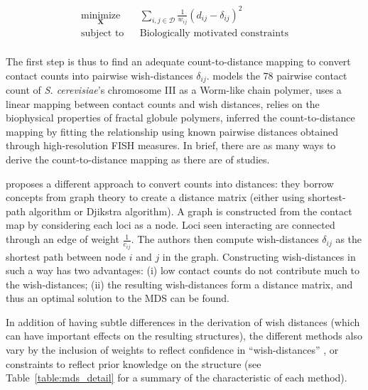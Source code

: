\documentclass[2columns]{article}
\newcommand{\Xb}{\textbf{X}}
\begin{document}
\begin{equation*}
\renewcommand{\arraystretch}{2}
\begin{array}{ccl}
\underset{\Xb}{\text{minimize}} & & \underset{i, j \in \mathcal{D}}{\sum}
\frac{1}{w_{ij}} (d_{ij} - \delta_{ij})^2 \\
\text{subject to} & & \text{Biologically motivated constraints} \\
\end{array}
\end{equation*}


The first step is thus to find an adequate count-to-distance mapping to
convert contact counts into pairwise wish-distances $\delta_{ij}$. 
\citet{dekker:capturing} models the 78 pairwise contact count of {\em S.
cerevisiae}'s chromosome III as a Worm-like chain polymer,
\citet{duan:three-dimensional} uses a linear mapping between contact counts
and wish distances, \citet{ay:three-dimensional} relies on the biophysical
properties of fractal globule polymers, \citet{tanizawa:mapping} inferred the
count-to-distance mapping by fitting the relationship using known pairwise
distances obtained through high-resolution FISH measures. In brief, there are
as many ways to derive the count-to-distance mapping as there are of studies.

\citet{lesne:3d, hirata:three-dimensional} proposes a different approach to convert counts into
distances: they borrow concepts from graph theory to
create a distance matrix (either using shortest-path algorithm or Djikstra
algorithm). A graph is constructed from the contact map by
considering each loci as a node. Loci seen interacting are connected through
an edge of weight $\frac{1}{c_{ij}}$. The authors then compute wish-distances
$\delta_{ij}$ as the shortest path between node $i$ and $j$ in the graph.
Constructing wish-distances in such a way has two advantages: (i) low contact
counts do not contribute much to the wish-distances; (ii) the resulting
wish-distances form a distance matrix, and thus an optimal solution to the MDS
can be found.

In addition of having subtle differences in the derivation of wish distances
(which can have important effects on the resulting structures),
the different methods also vary by the inclusion of weights to reflect
confidence in ``wish-distances'' \citep{ay:three-dimensional}, or constraints
to reflect prior knowledge on the structure \citep{ay:three-dimensional,
dekker:capturing, duan:three-dimensional} (see Table~\ref{table:mds_detail}
for a summary of the characteristic of each method).
\end{document}
